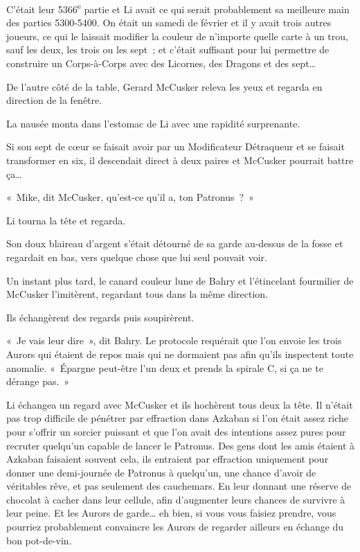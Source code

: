 C'était leur 5366\textsuperscript{e} partie et Li avait ce qui serait probablement sa meilleure main des parties 5300-5400. On était un samedi de février et il y avait trois autres joueurs, ce qui le laissait modifier la couleur de n'importe quelle carte à un trou, sauf les deux, les trois ou les sept~; et c'était suffisant pour lui permettre de construire un Corps-à-Corps avec des Licornes, des Dragons et des sept…

De l'autre côté de la table, Gerard McCusker releva les yeux et regarda en direction de la fenêtre.

La nausée monta dans l'estomac de Li avec une rapidité surprenante.

Si son sept de cœur se faisait avoir par un Modificateur Détraqueur et se faisait transformer en six, il descendait direct à deux paires et McCusker pourrait battre ça…

«~Mike, dit McCusker, qu'est-ce qu'il a, ton Patronus~?~»

Li tourna la tête et regarda.

Son doux blaireau d'argent s'était détourné de sa garde au-dessus de la fosse et regardait en bas, vers quelque chose que lui seul pouvait voir.

Un instant plus tard, le canard couleur lune de Bahry et l'étincelant fourmilier de McCusker l'imitèrent, regardant tous dans la même direction.

Ils échangèrent des regards puis soupirèrent.

«~Je vais leur dire~», dit Bahry. Le protocole requérait que l'on envoie les trois Aurors qui étaient de repos mais qui ne dormaient pas afin qu'ils inspectent toute anomalie. «~Épargne peut-être l'un deux et prends la spirale C, si ça ne te dérange pas.~»

Li échangea un regard avec McCusker et ils hochèrent tous deux la tête. Il n'était pas trop difficile de pénétrer par effraction dans Azkaban si l'on était assez riche pour s'offrir un sorcier puissant et que l'on avait des intentions assez pures pour recruter quelqu'un capable de lancer le Patronus. Des gens dont les amis étaient à Azkaban faisaient souvent cela, ils entraient par effraction uniquement pour donner une demi-journée de Patronus à quelqu'un, une chance d'avoir de véritables rêve, et pas seulement des cauchemars. En leur donnant une réserve de chocolat à cacher dans leur cellule, afin d'augmenter leurs chances de survivre à leur peine. Et les Aurors de garde… eh bien, si vous vous faisiez prendre, vous pourriez probablement convaincre les Aurors de regarder ailleurs en échange du bon pot-de-vin.

